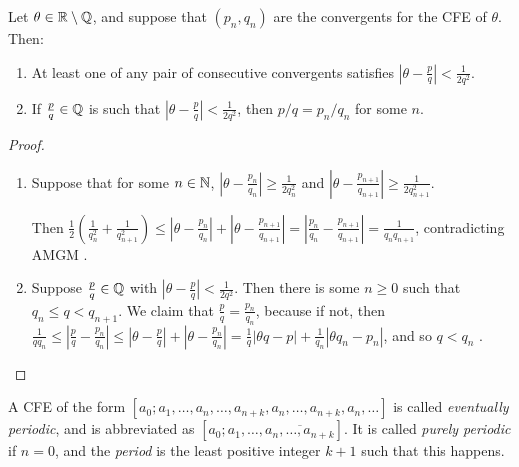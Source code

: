 \documentclass[10pt,a4paper]{article}
\begin{document}
\begin{theorem}
Let $\theta \in \mathbb{R}\setminus \mathbb{Q}$, and suppose that $(p_n, q_n)$ are the convergents for the CFE of $\theta$. Then:
\begin{enumerate}
\item At least one of any pair of consecutive convergents satisfies $|\theta-\frac{p}{q}| < \frac{1}{2q^2}$.
\item If $\frac{p}{q} \in \mathbb{Q}$ is such that $|\theta-\frac{p}{q}| < \frac{1}{2q^2}$, then $p/q = p_n/q_n$ for some $n$.
\end{enumerate}
\end{theorem}
\begin{proof}
\item
\begin{enumerate}
\item Suppose that for some $n \in \mathbb{N}$, $|\theta-\frac{p_n}{q_n}| \geq \frac{1}{2q_n^2}$ and $|\theta - \frac{p_{n+1}}{q_{n+1}}|\geq \frac{1}{2q_{n+1}^2}$.

Then $\frac{1}{2}\left(\frac{1}{q_n^2} + \frac{1}{q_{n+1}^2}\right) \leq |\theta-\frac{p_n}{q_n}| + |\theta - \frac{p_{n+1}}{q_{n+1}}| = |\frac{p_n}{q_n} - \frac{p_{n+1}}{q_{n+1}}| = \frac{1}{q_nq_{n+1}}$, contradicting AMGM \contr.

\item Suppose $\frac{p}{q} \in \mathbb{Q}$ with $|\theta-\frac{p}{q}| < \frac{1}{2q^2}$. Then there is some $n \geq 0$ such that $q_n \leq q < q_{n+1}$. We claim that $\frac{p}{q} = \frac{p_n}{q_n}$, because if not, then $\frac{1}{qq_n} \leq |\frac{p}{q} - \frac{p_n}{q_n}| \leq |\theta - \frac{p}{q}| + |\theta-\frac{p_n}{q_n}| = \frac{1}{q}|\theta q - p| + \frac{1}{q_n}|\theta q_n-p_n|$, and so $q < q_n$ \contr.
\end{enumerate}
\end{proof}

A CFE of the form $[a_0;a_1,\ldots,a_n,\ldots,a_{n+k},a_n,\ldots,a_{n+k},a_n,\ldots]$ is called \emph{eventually periodic}, and is abbreviated as $[a_0;a_1,\ldots,\overline{a_n,\ldots,a_{n+k}}]$. It is called \emph{purely periodic} if $n=0$, and the \emph{period} is the least positive integer $k+1$ such that this happens.
\end{document}
